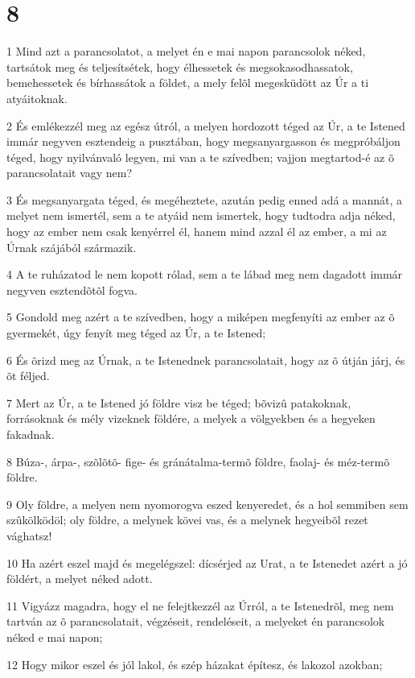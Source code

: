 \chapter{8}

\par 1 Mind azt a parancsolatot, a melyet én e mai napon parancsolok néked, tartsátok meg és teljesítsétek, hogy élhessetek és megsokasodhassatok, bemehessetek és bírhassátok a földet, a mely felõl megesküdött az Úr a ti atyáitoknak.
\par 2 És emlékezzél meg az egész útról, a melyen hordozott téged az Úr, a te Istened immár negyven esztendeig a pusztában, hogy megsanyargasson és megpróbáljon  téged, hogy nyilvánvaló legyen, mi van a te szívedben; vajjon megtartod-é az õ parancsolatait vagy nem?
\par 3 És megsanyargata téged, és megéheztete, azután pedig enned adá a mannát, a melyet nem ismertél, sem a te atyáid nem ismertek, hogy tudtodra adja néked, hogy az ember nem csak kenyérrel  él, hanem mind azzal él az ember, a mi az Úrnak szájából származik.
\par 4 A te ruházatod le nem kopott rólad, sem a te lábad meg nem  dagadott immár negyven esztendõtõl fogva.
\par 5 Gondold meg azért a te szívedben, hogy a miképen megfenyíti az ember az õ gyermekét, úgy fenyít meg téged az Úr, a te Istened;
\par 6 És õrizd meg az Úrnak, a te Istenednek parancsolatait, hogy az õ útján járj, és õt féljed.
\par 7 Mert az Úr, a te Istened jó földre visz be téged; bõvizû patakoknak, forrásoknak és mély vizeknek földére, a melyek a völgyekben és a hegyeken fakadnak.
\par 8 Búza-, árpa-, szõlõtõ- fige- és gránátalma-termõ földre, faolaj- és méz-termõ földre.
\par 9 Oly földre, a melyen nem nyomorogva eszed kenyeredet, és a hol semmiben sem szûkölködöl; oly földre, a melynek kövei vas, és a melynek hegyeibõl rezet vághatsz!
\par 10 Ha azért eszel majd és megelégszel: dícsérjed az Urat, a te Istenedet azért a jó földért, a melyet néked adott.
\par 11 Vigyázz magadra, hogy el ne felejtkezzél az Úrról, a te Istenedrõl, meg nem tartván az õ parancsolatait, végzéseit, rendeléseit, a melyeket én parancsolok néked e mai napon;
\par 12 Hogy mikor eszel és jól lakol, és szép házakat építesz, és lakozol azokban;
